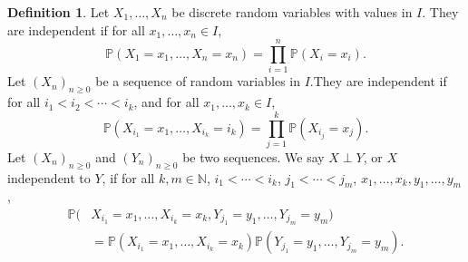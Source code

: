 \documentclass[12pt]{article}
\theoremstyle{definition}
\newtheorem{definition}{Definition}[section]
\theoremstyle{remark}
\begin{document}
\begin{definition}
	Let $X_1, \ldots, X_{n}$ be discrete random variables with values in $I$. They are independent if for all $x_1, \ldots, x_n \in I$,
	\[
		\mathbb{P}(X_1 = x_1, \ldots, X_n = x_n) = \prod_{i = 1}^{n} \mathbb{P}(X_i = x_i)
	.\]
	Let $(X_n)_{n \geq 0}$ be a sequence of random variables in $I$.They are independent if for all $i_1 < i_2 < \cdots < i_k$, and for all $x_1, \ldots, x_k \in I$,
	\[
		\mathbb{P}(X_{i_1} = x_1, \ldots, X_{i_k} = i_k) = \prod_{j = 1}^{k} \mathbb{P}(X_{i_j} = x_j)
	.\]
	Let $(X_n)_{n \geq 0}$ and $(Y_n)_{n \geq 0}$ be two sequences. We say $X \perp Y$, or $X$ independent to $Y$, if for all $k, m \in \mathbb{N}$, $i_1 < \cdots < i_k$, $j_1 < \cdots < j_m$, $x_1, \ldots, x_k, y_1, \ldots, y_m$,
	\begin{align*}
		\mathbb{P}(&X_{i_1} = x_1, \ldots, X_{i_k} = x_k, Y_{j_1} = y_1, \ldots, Y_{j_m} = y_m) \\
			   &= \mathbb{P}(X_{i_1} = x_1, \ldots, X_{i_k} = x_k) \mathbb{P}(Y_{j_1} = y_1, \ldots, Y_{j_m} = y_m)
	.\end{align*}
\end{definition}
\end{document}
